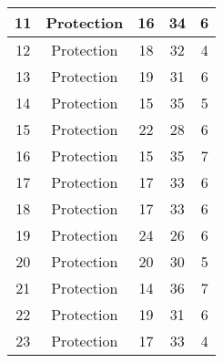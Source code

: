 \documentclass[results.tex]{subfiles}
\begin{document}
\begin{center}
\begin{tabular}{| c || c | c | c | c |}
            \hline
            11                      & Protection                   & 16                     & 34                      & 6                    \\
            \hline
            12                      & Protection                   & 18                     & 32                      & 4                    \\
            \hline
            13                      & Protection                   & 19                     & 31                      & 6                    \\
            \hline
            14                      & Protection                   & 15                     & 35                      & 5                    \\
            \hline
            15                      & Protection                   & 22                     & 28                      & 6                    \\
            \hline
            16                      & Protection                   & 15                     & 35                      & 7                    \\
            \hline
            17                      & Protection                   & 17                     & 33                      & 6                    \\
            \hline
            18                      & Protection                   & 17                     & 33                      & 6                    \\
            \hline
            19                      & Protection                   & 24                     & 26                      & 6                    \\
            \hline
            20                      & Protection                   & 20                     & 30                      & 5                    \\
            \hline
            21                      & Protection                   & 14                     & 36                      & 7                    \\
            \hline
            22                      & Protection                   & 19                     & 31                      & 6                    \\
            \hline
            23                      & Protection                   & 17                     & 33                      & 4                    \\

\end{tabular}
\end{center}
\end{document}
